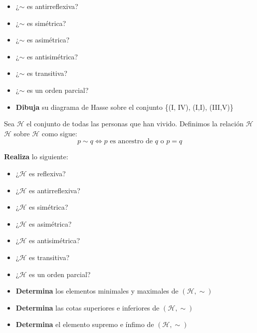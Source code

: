 \documentclass[oneside]{style}
\begin{document}
\begin{questions}[label=\protect\circled{\bfseries\arabic*}]
{\begin{itemize}
            \item ¿$\sim$ es antirreflexiva? 

            \item ¿$\sim$ es simétrica? 

            \item ¿$\sim$ es asimétrica? 

            \item ¿$\sim$ es antisimétrica? 

            \item ¿$\sim$ es transitiva? 

            \item ¿$\sim$ es un orden parcial? 

            \item \textbf{Dibuja} su diagrama de Hasse sobre el conjunto 
            \{(I, IV), (I,I), (III,V)\}
        \end{itemize}
    }

    \question
    {
        Sea $\mathcal{H}$ el conjunto de todas las personas que han vivido. 
        Definimos la relación $\mathcal{H}$$\mathcal{H}$ sobre $\mathcal{H}$ como sigue:
        \begin{equation*}
            p \sim q \Leftrightarrow p \text{ es ancestro de } q \text{ o } 
            p=q
        \end{equation*}

        \textbf{Realiza} lo siguiente:
        \begin{itemize}
            \item ¿$\mathcal{H}$ es reflexiva?
            \item ¿$\mathcal{H}$ es antirreflexiva?
            \item ¿$\mathcal{H}$ es simétrica?
            \item ¿$\mathcal{H}$ es asimétrica?
            \item ¿$\mathcal{H}$ es antisimétrica?
            \item ¿$\mathcal{H}$ es transitiva?
            \item ¿$\mathcal{H}$ es un orden parcial?
            \item \textbf{Determina} los elementos minimales y maximales de 
            $(\mathcal{H}, \sim)$
            \item \textbf{Determina} las cotas superiores e inferiores de 
            $(\mathcal{H}, \sim)$
            \item \textbf{Determina} el elemento supremo e ínfimo de 
            $(\mathcal{H}, \sim)$
        \end{itemize}
    }


\end{questions}
\end{document}

